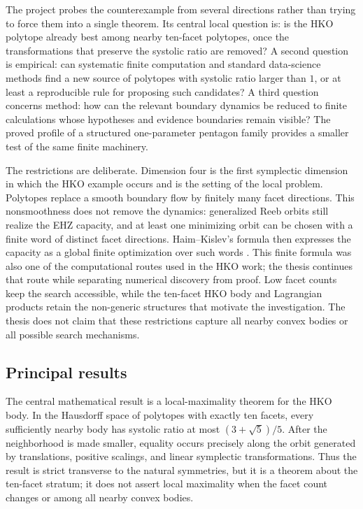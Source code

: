 The project probes the counterexample from several directions rather than
trying to force them into a single theorem.  Its central local question is:
is the HKO polytope already best among nearby ten-facet polytopes, once the
transformations that preserve the systolic ratio are removed?  A second
question is empirical: can systematic finite computation and standard
data-science methods find a new source of polytopes with systolic ratio larger
than $1$, or at least a reproducible rule for proposing such candidates?  A
third question concerns method: how can the relevant boundary dynamics be
reduced to finite calculations whose hypotheses and evidence boundaries
remain visible?  The proved profile of a structured one-parameter
pentagon family provides a smaller test of the same finite machinery.

The restrictions are deliberate.  Dimension four is the first symplectic
dimension in which the HKO example occurs and is the setting of the local
problem.  Polytopes replace a smooth boundary flow by finitely many facet
directions.  This nonsmoothness does not remove the dynamics: generalized Reeb
orbits still realize the EHZ capacity, and at least one minimizing orbit can be
chosen with a finite word of distinct facet directions.  Haim--Kislev's formula
then expresses the capacity as a global finite optimization over such words
\cite{HK2017}.  This finite formula was also one of the computational routes
used in the HKO work; the thesis continues that route while separating
numerical discovery from proof.  Low facet counts keep the search
accessible, while the ten-facet HKO body and Lagrangian products retain the
non-generic structures that motivate the investigation.  The thesis does not
claim that these restrictions capture all nearby convex bodies or all possible
search mechanisms.

\subsection{Principal results}

The central mathematical result is a local-maximality theorem for the HKO
body.  In the Hausdorff space of polytopes with exactly ten facets, every
sufficiently nearby body has systolic ratio at most
\((3+\sqrt5)/5\).  After the neighborhood is made smaller, equality occurs
precisely along the orbit generated by translations, positive scalings, and
linear symplectic transformations.  Thus the result is strict transverse to
the natural symmetries, but it is a theorem about the ten-facet stratum; it
does not assert local maximality when the facet count changes or among all
nearby convex bodies.

